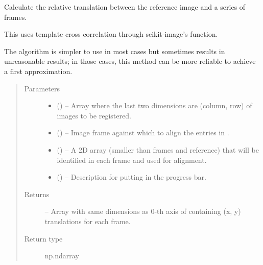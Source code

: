 \documentclass[letterpaper,10pt,english]{sphinxmanual}
\begin{document}

\begin{fulllineitems}
\label{\detokenize{xanespy:xanespy.xanes_math.register_template}}
Calculate the relative translation between the reference image and
a series of frames.

This uses template cross correlation through scikit-image's
 function.

The  algorithm is simpler to use in most
cases but sometimes results in unreasonable results; in those
cases, this method can be more reliable to achieve a first
approximation.
\begin{quote}\begin{description}
\item[{Parameters}] \leavevmode\begin{itemize}
\item {} 
 () -- Array where the last two dimensions are (column, row) of images
to be registered.

\item {} 
 () -- Image frame against which to align the entries in .

\item {} 
 () -- A 2D array (smaller than frames and reference) that will be
identified in each frame and used for alignment.

\item {} 
 (\sphinxstyleliteralemphasis{, }) -- Description for putting in the progress bar.

\end{itemize}

\item[{Returns}] \leavevmode
{} -- Array with same dimensions as 0-th axis of  containing
(x, y) translations for each frame.

\item[{Return type}] \leavevmode
np.ndarray

\end{description}\end{quote}

\end{fulllineitems}
\end{document}

